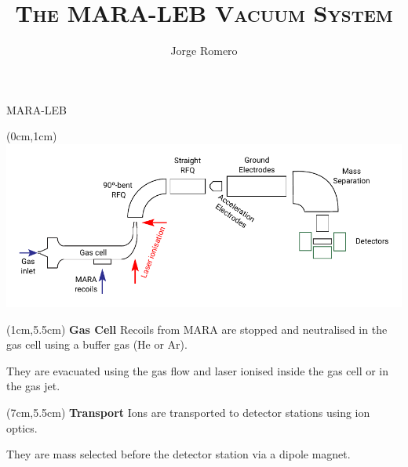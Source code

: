 \documentclass[9pt]{beamer}
\title{\textsc{The MARA-LEB Vacuum System}}
\subtitle{Jorge Romero}
\institute{}
\begin{document}
\titlepage


\begin{frame}{MARA-LEB}
    \begin{textblock*}{13cm}(0cm,1cm)
            \centering
            {\includegraphics[scale=.8]{assets/LEB.pdf}}
    \end{textblock*}
    
     \begin{textblock*}{5cm}(1cm,5.5cm)
      \vspace{1em}
      \centering
      \textbf{Gas Cell}
      \flushleft
      \vspace{-0.6em}
      Recoils from MARA are stopped and neutralised in the gas cell using a buffer gas (He or Ar).
      
      They are evacuated using the gas flow and laser ionised inside the gas cell or in the gas jet.
    \end{textblock*}
        
    \begin{textblock*}{5cm}(7cm,5.5cm)
        \centering
        \vspace{1em}
        \textbf{Transport}
        \flushleft
        \vspace{-0.6em}
      Ions are transported to detector stations using ion optics.
      
      They are mass selected before the detector station via a dipole magnet.
    \end{textblock*}
\end{frame}
\end{document}
